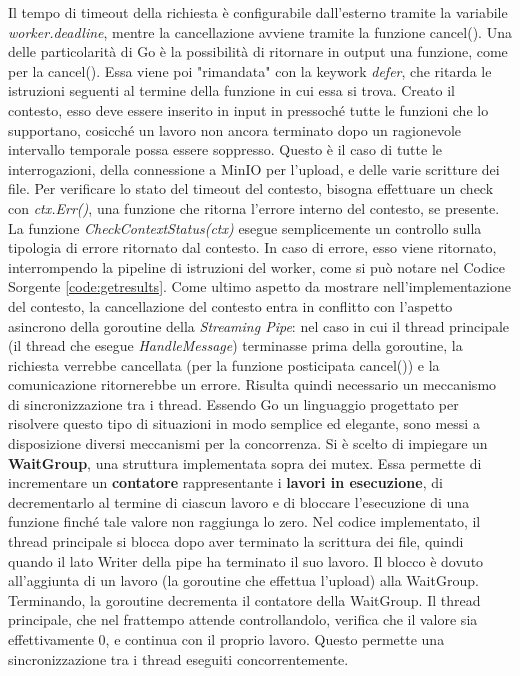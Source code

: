 Il tempo di timeout della richiesta è configurabile dall'esterno tramite la variabile \textit{worker.deadline}, mentre la cancellazione avviene tramite la funzione cancel(). Una delle particolarità di Go è la possibilità di ritornare in output una funzione, come per la cancel(). Essa viene poi "rimandata" con la keywork \textit{defer}, che ritarda le istruzioni seguenti al termine della funzione in cui essa si trova. Creato il contesto, esso deve essere inserito in input in pressoché tutte le funzioni che lo supportano, cosicché un lavoro non ancora terminato dopo un ragionevole intervallo temporale possa essere soppresso. Questo è il caso di tutte le interrogazioni, della connessione a MinIO per l'upload, e delle varie scritture dei file. Per verificare lo stato del timeout del contesto, bisogna effettuare un check con \textit{ctx.Err()}, una funzione che ritorna l'errore interno del contesto, se presente. La funzione \textit{CheckContextStatus(ctx)} esegue semplicemente un controllo sulla tipologia di errore ritornato dal contesto. In caso di errore, esso viene ritornato, interrompendo la pipeline di istruzioni del worker, come si può notare nel Codice Sorgente \ref{code:getresults}. Come ultimo aspetto da mostrare nell'implementazione del contesto, la cancellazione del contesto entra in conflitto con l'aspetto asincrono della goroutine della \textit{Streaming Pipe}: nel caso in cui il thread principale (il thread che esegue \textit{HandleMessage}) terminasse prima della goroutine, la richiesta verrebbe cancellata (per la funzione posticipata cancel()) e la comunicazione ritornerebbe un errore. Risulta quindi necessario un meccanismo di sincronizzazione tra i thread. Essendo Go un linguaggio progettato per risolvere questo tipo di situazioni in modo semplice ed elegante, sono messi a disposizione diversi meccanismi per la concorrenza. Si è scelto di impiegare un \textbf{WaitGroup}, una struttura implementata sopra dei mutex. Essa permette di incrementare un \textbf{contatore} rappresentante i \textbf{lavori in esecuzione}, di decrementarlo al termine di ciascun lavoro e di bloccare l'esecuzione di una funzione finché tale valore non raggiunga lo zero. Nel codice implementato, il thread principale si blocca dopo aver terminato la scrittura dei file, quindi quando il lato Writer della pipe ha terminato il suo lavoro. Il blocco è dovuto all'aggiunta di un lavoro (la goroutine che effettua l'upload) alla WaitGroup. Terminando, la goroutine decrementa il contatore della WaitGroup. Il thread principale, che nel frattempo attende controllandolo, verifica che il valore sia effettivamente 0, e continua con il proprio lavoro. Questo permette una sincronizzazione tra i thread eseguiti concorrentemente.